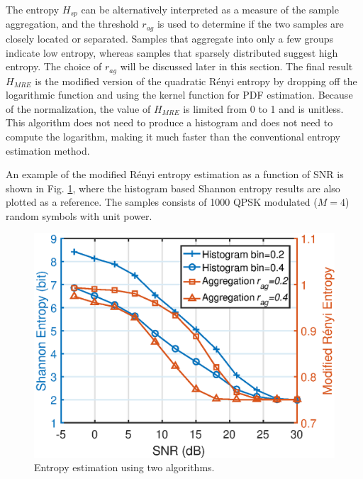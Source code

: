 \documentclass[journal,comsoc,onecolumn, 12pt,draftclsnofoot]{IEEEtran}
\begin{document}
The entropy \(H_{sp}\) can be alternatively interpreted as a measure of the sample aggregation,
and the threshold \(r_{ag}\) is used to determine if the two samples are closely located or separated.
Samples that aggregate into only a few groups indicate low entropy, whereas samples that sparsely distributed suggest high entropy.
The choice of \(r_{ag}\) will be discussed later in this section.
The final result \(H_{MRE}\) is the modified version of the quadratic R\'enyi entropy  by dropping off the logarithmic function and using the kernel function for PDF estimation.
Because of the normalization, the value of $H_{MRE}$ is limited from 0 to 1 and is unitless.
This algorithm does not need to produce a histogram and does not need to compute the logarithm, making it much faster than the conventional entropy estimation method.


An example of the modified R\'enyi entropy estimation as a function of SNR is shown in Fig. \ref{fig:MRE}, where the histogram based Shannon entropy results are also plotted as a reference.
The samples consists of 1000 QPSK modulated (\(M=4\)) random symbols with unit power.

\begin{figure}[ht]
\centering
\includegraphics[width=3 in]{pic/H_MR.eps}
\caption{Entropy estimation using two algorithms.}
\label{fig:MRE} 
\end{figure}
\end{document}

